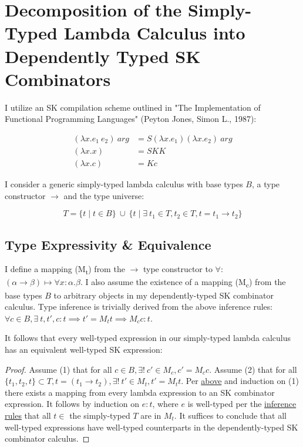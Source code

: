 \documentclass[11pt]{article}
\begin{document}
\label{decomplemma:1}
\section{Decomposition of the Simply-Typed Lambda Calculus into Dependently Typed SK Combinators}
\label{sec:org55be4ed}

I utilize an SK compilation scheme outlined in "The Implementation of Functional Programming Languages" (Peyton Jones, Simon L., 1987):

\begin{align}
(\lambda x.e_{1}\ e_{2})\ arg &= S (\lambda x.e_{1}) (\lambda x.e_{2})\ arg \\
(\lambda x.x) &= SKK \\
(\lambda x.c) &= K c
\end{align}

I consider a generic simply-typed lambda calculus with base types \(B\), a type constructor \(\rightarrow\) and the type universe:

\[
T = \{ t \mid t \in B\}\ \cup\ \{ t \mid \exists\  t_{1} \in T, t_{2} \in T, t = t_{1} \rightarrow t_{2} \}
\]

\label{maplemma:1}
\subsection{Type Expressivity \& Equivalence}
\label{sec:orgfb27a84}

I define a mapping (M\textsubscript{t}) from the \(\rightarrow\) type constructor to \(\forall\): \((\alpha \rightarrow \beta) \mapsto \forall x : \alpha.\beta\). I also assume the existence of a mapping (M\textsubscript{c}) from the base types \(B\) to arbitrary objects in my dependently-typed SK combinator calculus. Type inference is trivially derived from the above inference rules: \(\forall c \in B, \exists\ t, t', c : t \implies t' = M_{t} t \implies M_{c} c : t\).

It follows that every well-typed expression in our simply-typed lambda calculus has an equivalent well-typed SK expression:

\begin{proof}
Assume (1) that for all $c \in B, \exists!\ c' \in M_{c}, c' = M_{c} c$.
Assume (2) that for all $\{t_{1}, t_{2}, t\} \subset T, t = (t_{1} \rightarrow t_{2}), \exists!\ t' \in M_{t}, t' = M_{t} t$.
Per \href{decomplemma:1}{above} and induction on (1) there exists a mapping from every lambda expression to an SK combinator expression.
It follows by induction on $e : t$, where $e$ is well-typed per the \href{decomplemma:1}{inference rules} that all $t \in$ the simply-typed $T$ are in $M_{t}$.
It suffices to conclude that all well-typed expressions have well-typed counterparts in the dependently-typed SK combinator calculus.
\end{proof}
\end{document}
